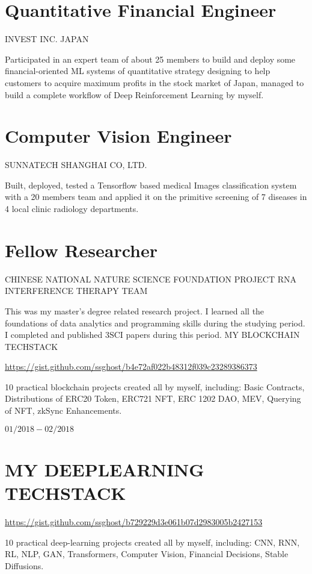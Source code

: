 \documentclass[10pt]{article}
\begin{document}
\section{Quantitative Financial Engineer}
INVEST INC. JAPAN

Participated in an expert team of about 25 members to build and deploy some financial-oriented ML systems of quantitative strategy designing to help customers to acquire maximum profits in the stock market of Japan, managed to build a complete workflow of Deep Reinforcement Learning by myself.

\section{Computer Vision Engineer}
SUNNATECH SHANGHAI CO, LTD.

Built, deployed, tested a Tensorflow based medical Images classification system with a 20 members team and applied it on the primitive screening of 7 diseases in 4 local clinic radiology departments.

\section{Fellow Researcher}
CHINESE NATIONAL NATURE SCIENCE FOUNDATION PROJECT RNA INTERFERENCE THERAPY TEAM

This was my master's degree related research project. I learned all the foundations of data analytics and programming skills during the studying period. I completed and published $3 \mathrm{SCI}$ papers during this period. MY BLOCKCHAIN TECHSTACK

\href{https://gist.github.com/ssghost/b4e72af022b48312f039c23289386373}{https://gist.github.com/ssghost/b4e72af022b48312f039c23289386373}

10 practical blockchain projects created all by myself, including: Basic Contracts, Distributions of ERC20 Token, ERC721 NFT, ERC 1202 DAO, MEV, Querying of NFT, zkSync Enhancements.

$01 / 2018-02 / 2018$

\section{MY DEEPLEARNING TECHSTACK}
\href{https://gist.github.com/ssghost/b729229d3e061b07d2983005b2427153}{https://gist.github.com/ssghost/b729229d3e061b07d2983005b2427153}

10 practical deep-learning projects created all by myself, including: CNN, RNN, RL, NLP, GAN, Transformers, Computer Vision, Financial Decisions, Stable Diffusions.
\end{document}
